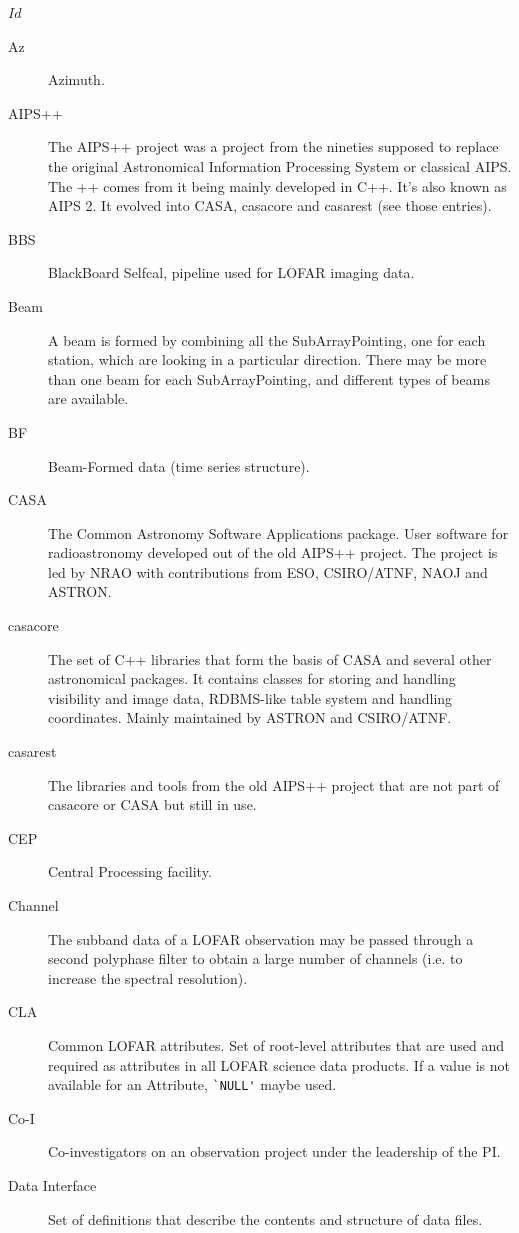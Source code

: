 \svnInfo $Id$

\begin{description}
\item[Az] Azimuth.
\item[AIPS++] The AIPS++ project was a project from the nineties supposed to replace the original Astronomical Information Processing System or classical AIPS. The ++ comes from it being mainly developed in C++. It's also known as AIPS 2. It evolved into CASA, casacore and casarest (see those entries).
\item[BBS] BlackBoard Selfcal, pipeline used for LOFAR imaging data.
\item[Beam] A beam is formed by combining all the SubArrayPointing,
one for each station, which are looking in a particular direction.
There may be more than one beam for each SubArrayPointing, and different types
of beams are available.
\item[BF] Beam-Formed data (time series structure).
\item[CASA] The Common Astronomy Software Applications package. User software for radioastronomy developed out of the old AIPS++ project. The project is led by NRAO with contributions from ESO, CSIRO/ATNF, NAOJ and ASTRON. \cite{website:casa}
\item[casacore] The set of C++ libraries that form the basis of CASA and several other astronomical packages. It contains classes for storing and handling visibility and image data, RDBMS-like table system and handling coordinates. Mainly maintained by ASTRON and CSIRO/ATNF. \cite{website:casacore}
\item[casarest] The libraries and tools from the old AIPS++ project that are not part of casacore or CASA but still in use.
\item[CEP] Central Processing facility.
\item[Channel] The subband data of a LOFAR observation may be passed through a
second polyphase filter to obtain a large number of channels (i.e. to increase
the spectral resolution).
\item[CLA] Common LOFAR attributes. Set of root-level attributes that
  are used and required as attributes in all LOFAR science data
  products. If a value is not available for an Attribute,
  \verb|`NULL'| maybe used.
\item[Co-I] Co-investigators on an observation project under the leadership of
the PI.
\item[Data Interface] Set of definitions that describe the contents
  and structure of data files.

\end{description}

